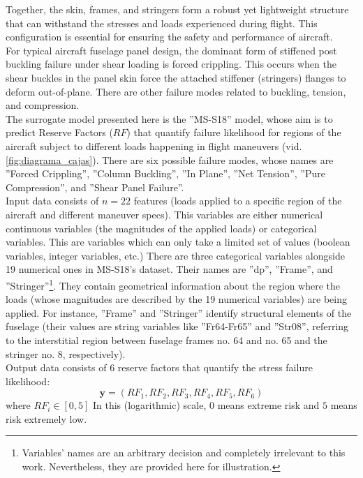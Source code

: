 Together, the skin, frames, and stringers form a robust yet lightweight structure that can withstand the stresses and loads experienced during flight. This configuration is essential for ensuring the safety and performance of aircraft.\\
\indent For typical aircraft fuselage panel design, the dominant form of stiffened post buckling failure under shear loading is forced crippling\cite{bijlaard1955buckling}. This occurs when the shear buckles in the panel skin force the attached stiffener (stringers) flanges to deform out-of-plane. There are other failure modes related to buckling, tension, and compression.\\
%
\indent The surrogate model presented here is the ''MS-S18'' model, whose aim is to predict Reserve Factors ($RF$) that quantify failure likelihood for regions of the aircraft subject to different loads happening in flight maneuvers (vid. \autoref{fig:diagrama_cajas}). There are six possible failure modes, whose names are ''Forced Crippling'', ''Column Buckling'', ''In Plane'', ''Net Tension'', ''Pure Compression'', and ''Shear Panel Failure''.\\
%
\indent Input data consists of $n=22$ features (loads applied to a specific region of the aircraft and different maneuver specs). This variables are either numerical continuous variables (the magnitudes of the applied loads) or categorical variables. This are variables which can only take a limited set of values (\eg boolean variables, integer variables, etc.) There are three categorical variables alongside 19 numerical ones in MS-S18's dataset. Their names are ''dp'', ''Frame'', and ''Stringer''\footnote{Variables' names are an arbitrary decision and completely irrelevant to this work. Nevertheless, they are provided here for illustration.}. They contain geometrical information about the region where the loads (whose magnitudes are described by the 19 numerical variables) are being applied. For instance, ''Frame'' and ''Stringer'' identify structural elements of the fuselage (their values are string variables like ''Fr64-Fr65'' and ''Str08'', referring to the interstitial region between fuselage frames no. 64 and no. 65 and the stringer no. 8, respectively).\\
%
\indent Output data consists of 6 reserve factors that quantify the stress failure likelihood:
$$
\mathbf{y}=(RF_1,RF_2,RF_3,RF_4,RF_5,RF_6)
$$
where $RF_i\in [0,5]$
In this (logarithmic) scale, $0$ means extreme risk and $5$ means risk extremely low.\\
